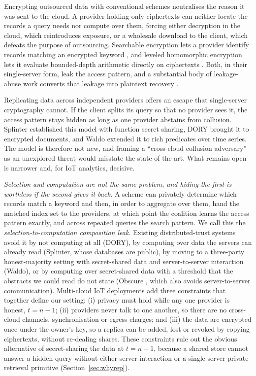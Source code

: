 \documentclass[a4paper,fleqn]{cas-sc}
\begin{document}
Encrypting outsourced data with conventional schemes neutralises the reason it
was sent to the cloud. A provider holding only ciphertexts can neither locate
the records a query needs nor compute over them, forcing either decryption in
the cloud, which reintroduces exposure, or a wholesale download to the client,
which defeats the purpose of outsourcing. Searchable encryption lets a
provider identify records matching an encrypted keyword
\citep{song2000practical,curtmola2006searchable,islam2023keyword}, and leveled
homomorphic encryption lets it evaluate bounded-depth arithmetic directly on
ciphertexts \citep{fan2012somewhat,cryptoeprint:2016/421}. Both, in their
single-server form, leak the access pattern, and a substantial body of
leakage-abuse work converts that leakage into plaintext recovery
\citep{islam2012access,cash2015leakage,grubbs2017leakage}.

Replicating data across independent providers offers an escape that
single-server cryptography cannot. If the client splits its query so that no
provider sees it, the access pattern stays hidden as long as one provider
abstains from collusion. Splinter \citep{splinter} established this model with
function secret sharing, DORY \citep{dory} brought it to encrypted documents,
and Waldo \citep{waldo} extended it to rich predicates over time series. The
model is therefore not new, and framing a ``cross-cloud collusion adversary''
as an unexplored threat would misstate the state of the art. What remains open
is narrower and, for IoT analytics, decisive.

\emph{Selection and computation are not the same problem, and hiding the first
is worthless if the second gives it back.} A scheme can privately determine
which records match a keyword and then, in order to aggregate over them, hand
the matched index set to the providers, at which point the coalition learns
the access pattern exactly, and across repeated queries the search pattern. We
call this the \emph{selection-to-computation composition leak}. Existing
distributed-trust systems avoid it by not computing at all (DORY), by
computing over data the servers can already read (Splinter, whose databases
are public), by moving to a three-party honest-majority setting with
secret-shared data and server-to-server interaction (Waldo), or by computing
over secret-shared data with a threshold that the abstracts we could read do
not state (Obscure \citep{gupta2019obscure,gupta2020obscure}, which also
avoids server-to-server communication). Multi-cloud IoT deployments add three
constraints that together define our setting: (i) privacy must hold while any
one provider is honest, $t=n-1$; (ii) providers never talk to one another, so
there are no cross-cloud channels, synchronisation or egress charges; and
(iii) the data are encrypted once under the owner's key, so a replica can be
added, lost or revoked by copying ciphertexts, without re-dealing shares.
These constraints rule out the obvious alternative of secret-sharing the data
at $t=n-1$, because a shared store cannot answer a hidden query without either
server interaction or a single-server private-retrieval primitive
(Section~\ref{sec:whyrep}).
\end{document}
